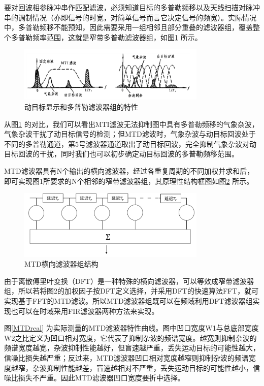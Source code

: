 \documentclass[12pt]{article}
\begin{document}
要对回波相参脉冲串作匹配滤波，必须知道目标的多普勒频移以及天线扫描对脉冲串的调制情况（亦即信号的时宽，对简单信号而言它决定信号的频宽）。实际情况中，多普勒频移不能预知，因此需要采用一组相邻且部分重叠的滤波器组，覆盖整个多普勒频率范围，这就是窄带多普勒滤波器组，如图\ref{DTMBXSHDPLLBQZDTX}
所示。
\begin{figure}[htbp]
  \centering
  \includegraphics[width=0.8\textwidth]{word/0019}
  \caption{动目标显示和多普勒滤波器组的特性}\label{DTMBXSHDPLLBQZDTX}
\end{figure}\par
从图\ref{DTMBXSHDPLLBQZDTX}
的对比，我们可以看出MTI滤波无法抑制图中具有多普勒频移的气象杂波，气象杂波干扰了动目标信号的检测；但MTD滤波时，气象杂波与动目标回波处于不同的多普勒通道，第5号滤波器通道取出了动目标回波，完全抑制气象杂波对动目标回波的干扰，同时我们也可以初步确定动目标回波的多普勒频移范围。\par
MTD滤波器具有N个输出的横向滤波器，经过各重复周期的不同加权并求和后，即可实现图1所要求的N个相邻的窄带滤波器组，其原理性结构框图如图\ref{MTD}
所示。
\begin{figure}[htbp]
  \centering
  \includegraphics[width=0.8\textwidth]{PPT/6}
  \caption{MTD横向滤波器组结构}\label{MTD}
\end{figure}\par
由于离散傅里叶变换（DFT）是一种特殊的横向滤波器，可以等效成窄带滤波器组，所以若将图2的加权因子按DFT定义选择，并采用DFT的快速算法FFT，就可实现基于FFT的MTD滤波。所以MTD滤波器组既可以在频域利用DFT滤波器组实现也可以在时域采用FIR滤波器两种方法来实现。\par
图\ref{MTDreal}
为实际测量的MTD滤波器特性曲线。图中凹口宽度W1与总底部宽度W2之比定义为凹口相对宽度，它代表了抑制杂波的频谱宽度。越宽则抑制杂波的频谱宽度越宽，杂波抑制性能越好，但盲速越严重，丢失运动目标的可能性越大，信噪比损失越严重；反过来，MTD滤波器凹口相对宽度越窄则抑制杂波的频谱宽度越窄，杂波抑制性能越差，盲速越相对不严重，丢失运动目标的可能性越小，信噪比损失不严重。因此MTD滤波器凹口宽度要折中选择。
\end{document}
